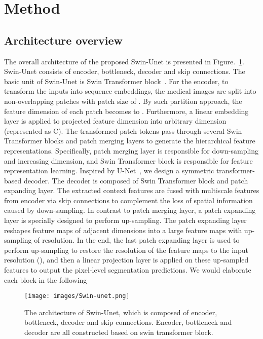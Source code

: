 \documentclass[runningheads]{llncs}
\begin{document}
 \section{Method}

\subsection{Architecture overview}

The overall architecture of the proposed Swin-Unet is presented in Figure.~\ref{swin_unet}. Swin-Unet consists of encoder, bottleneck, decoder and skip connections. The basic unit of Swin-Unet is Swin Transformer block~\cite{swin}. For the encoder, to transform the inputs into sequence embeddings, the medical images are split into non-overlapping patches with patch size of . By such partition approach, the feature dimension of each patch becomes to . Furthermore, a linear embedding layer is applied to projected feature dimension into arbitrary dimension (represented as C). The transformed patch tokens pass through several Swin Transformer blocks and patch merging layers to generate the hierarchical feature representations. Specifically, patch merging layer is responsible for down-sampling and increasing dimension, and Swin Transformer block is responsible for feature representation learning.
Inspired by U-Net~\cite{unet}, we design a symmetric transformer-based decoder. The decoder is composed of Swin Transformer block and patch expanding layer. The extracted context features are fused with multiscale features from encoder via skip connections to complement the loss of spatial information caused by down-sampling. In contrast to patch merging layer, a patch expanding layer is specially designed to perform up-sampling. The patch expanding layer reshapes feature maps of adjacent dimensions into a large feature maps with  up-sampling of resolution. In the end, the last patch expanding layer is used to perform  up-sampling to restore the resolution of the feature maps to the input resolution (), and then a linear projection layer is applied on these up-sampled features to output the pixel-level segmentation predictions. We would elaborate each block in the following


\begin{figure}[t!]
\texttt{[image: images/Swin-unet.png]}
\caption{The architecture of Swin-Unet, which is composed of encoder, bottleneck, decoder and skip connections. Encoder, bottleneck and decoder are all constructed based on swin transformer block.} \label{swin_unet}
\end{figure}
\end{document}
